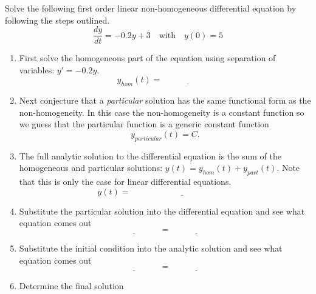 \begin{problem}
    Solve the following first order linear non-homogeneous differential equation by
    following the steps outlined.
    \[ \frac{dy}{dt} = -0.2 y + 3 \quad \text{with} \quad y(0) = 5 \]
    \begin{enumerate}
        \item First solve the homogeneous part of the equation using separation of
            variables: $y' = -0.2y$.
            \[ y_{hom}(t) = \underline{\hspace{1in}} \]
        \item Next conjecture that a {\it particular} solution has the same functional
            form as the non-homogeneity.  In this case the non-homogeneity is a constant
            function so we guess that the particular function is a generic constant
            function
            \[ y_{particular}(t) = C. \]
        \item The full analytic solution to the differential equation is the sum of the
            homogeneous and particular solutions: $y(t) = y_{hom}(t) + y_{part}(t)$.  Note
            that this is only the case for linear differential equations.
            \[ y(t) = \underline{\hspace{2in}} \]
        \item Substitute the particular solution into the differential equation and see
            what equation comes out
            \[ \underline{\hspace{1in}} = \underline{\hspace{1in}} \]
        \item Substitute the initial condition into the analytic solution and see what
            equation comes out
            \[ \underline{\hspace{1in}} = \underline{\hspace{1in}} \]
        \item Determine the final solution
    \end{enumerate}
\end{problem}

